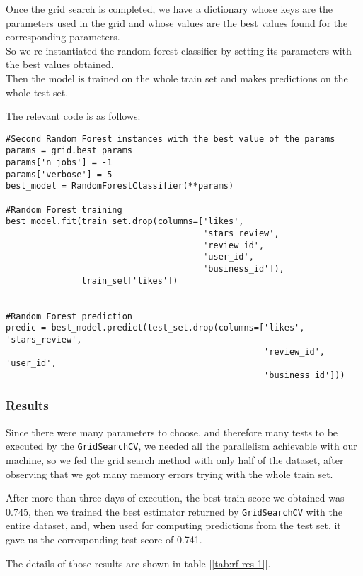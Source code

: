 Once the grid search is completed, we have a dictionary whose keys are the parameters used in the grid and whose values are the best values found for the corresponding parameters.\\
So we re-instantiated the random forest classifier by setting its parameters with the best values obtained.\\
Then the model is trained on the whole train set and makes predictions on the whole test set.

The relevant code is as follows:

\begin{lstlisting}[caption={Random Forest training and predictions}, label={lst:rf-fit}]
#Second Random Forest instances with the best value of the params
params = grid.best_params_
params['n_jobs'] = -1
params['verbose'] = 5
best_model = RandomForestClassifier(**params)

#Random Forest training
best_model.fit(train_set.drop(columns=['likes', 
                                       'stars_review', 
                                       'review_id', 
                                       'user_id', 
                                       'business_id']),
               train_set['likes'])


#Random Forest prediction 
predic = best_model.predict(test_set.drop(columns=['likes', 'stars_review',
                                                   'review_id', 'user_id', 
                                                   'business_id']))
\end{lstlisting}


\subsubsection{Results}

Since there were many parameters to choose, and therefore many tests to be executed by the \texttt{GridSearchCV}, we needed all the parallelism achievable with our machine, so we fed the grid search method with only half of the dataset, after observing that we got many memory errors trying with the whole train set.

After more than three days of execution, the best train score we obtained was 0.745, then we trained the best estimator returned by \texttt{GridSearchCV} with the entire dataset, and, when used for computing predictions from the test set, it gave us the corresponding test score of 0.741.

The details of those results are shown in table [\ref{tab:rf-res-1}].

